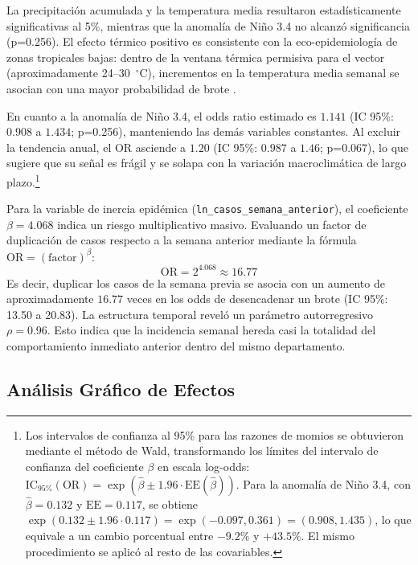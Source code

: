 \documentclass[11pt,a4paper]{article}
\begin{document}
La precipitación acumulada y la temperatura media resultaron estadísticamente significativas al 5\%, mientras que la anomalía de Niño 3.4 no alcanzó significancia (p=0.256). El efecto térmico positivo es consistente con la eco-epidemiología de zonas tropicales bajas: dentro de la ventana térmica permisiva para el vector (aproximadamente 24--30~$^\circ$C), incrementos en la temperatura media semanal se asocian con una mayor probabilidad de brote \parencite{mordecai2017detecting}.

\medskip

En cuanto a la anomalía de Niño 3.4, el odds ratio estimado es $1.141$
(IC 95\%: $0.908$ a $1.434$; p=0.256), manteniendo las demás variables
constantes. Al excluir la tendencia anual, el OR asciende a $1.20$
(IC 95\%: $0.987$ a $1.46$; p=0.067), lo que sugiere que su señal es frágil
y se solapa con la variación macroclimática de largo plazo.\footnote{Los intervalos de
	confianza al 95\% para las razones de momios se obtuvieron mediante el
	método de Wald, transformando los límites del intervalo de confianza del
	coeficiente $\beta$ en escala log-odds:
	$\text{IC}_{95\%}(\text{OR}) = \exp\left(\hat{\beta} \pm 1.96 \cdot
	\text{EE}(\hat{\beta})\right)$. Para la anomalía de Niño 3.4, con
	$\hat{\beta} = 0.132$ y $\text{EE} = 0.117$, se obtiene
	$\exp(0.132 \pm 1.96 \cdot 0.117) = \exp(-0.097, 0.361) = (0.908, 1.435)$,
	lo que equivale a un cambio porcentual entre $-9.2\%$ y $+43.5\%$.
	El mismo procedimiento se aplicó al resto de las covariables.}

Para la variable de inercia epidémica (\texttt{ln\_casos\_semana\_anterior}), el coeficiente $\beta = 4.068$ indica un riesgo multiplicativo masivo. Evaluando un factor de duplicación de casos respecto a la semana anterior mediante la fórmula $\text{OR} = (\text{factor})^\beta$:
\begin{equation}
\text{OR} = 2^{4.068} \approx 16.77
\end{equation}
Es decir, duplicar los casos de la semana previa se asocia con un aumento de aproximadamente $16.77$ veces en los odds de desencadenar un brote (IC 95\%: 13.50 a 20.83). La estructura temporal reveló un parámetro autorregresivo $\rho = 0.96$. Esto indica que la incidencia semanal hereda casi la totalidad del comportamiento inmediato anterior dentro del mismo departamento.

\subsection{Análisis Gráfico de Efectos}
\end{document}
